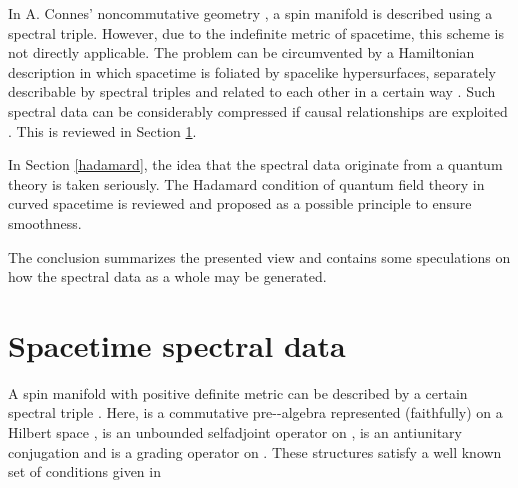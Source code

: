 \documentclass[a4paper,10pt,oneside]{amsart}
\theoremstyle{plain}
\theoremstyle{definition}
\theoremstyle{remark}
\begin{document}
In A. Connes' noncommutative geometry
\cite{Connes94,Connes95,Connes96a}, a spin manifold is described
using a spectral triple. However, due to the indefinite metric of
spacetime, this scheme is not directly applicable. The problem can
be circumvented by a Hamiltonian description in which spacetime is
foliated by spacelike hypersurfaces, separately describable by
spectral triples and related to each other in a certain way
\cite{Hawkins97}. Such spectral data can be considerably
compressed if causal relationships are exploited \cite{Kopf98}.
This is reviewed in Section \ref{spectraldata}.



In Section \ref{hadamard}, the idea that the spectral data
originate from a quantum theory is taken seriously. The Hadamard
condition of quantum field theory in curved spacetime
\cite{Wald1978a,Wald1978b,Fulling-Sweeny-Wald,
Fulling-Narcowich-Wald,Kay-Wald,Verch1994,Radzikowski1996a,
Radzikowski1996b,Junker,Wellmann,Hollands1999a,Hollands1999b}
is reviewed and proposed as a possible principle
to ensure smoothness.



The conclusion summarizes the presented view and contains some
speculations on how the spectral data as a whole may be generated.


\section{Spacetime spectral data}\label{spectraldata}


A spin manifold with positive definite metric can be described
\cite{Connes94,Connes95,Connes96a} by a certain spectral triple
\coordHE{}.
 Here, \coordHE{} is a commutative pre-\coordHE{}-algebra
represented (faithfully) on a Hilbert space \coordHE{}, \coordHE{} is
an unbounded selfadjoint operator on \coordHE{}, \coordHE{} is an
antiunitary conjugation and \myHighlight{$\gamma$}\coordHE{} is a grading operator on
\coordHE{}. These structures satisfy a well known set of conditions
given in \cite{Connes96a}
\end{document}

